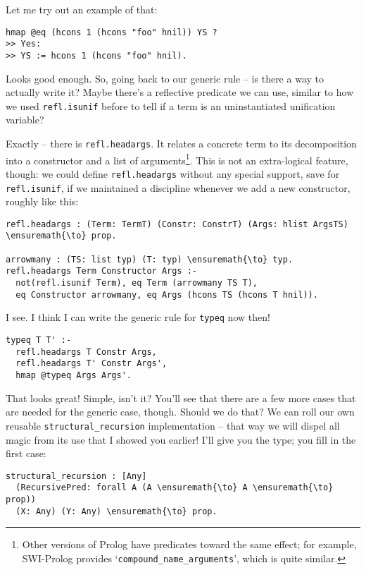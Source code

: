 \heroSTUDENT{} Let me try out an example of that:

\begin{verbatim}
hmap @eq (hcons 1 (hcons "foo" hnil)) YS ?
>> Yes:
>> YS := hcons 1 (hcons "foo" hnil).
\end{verbatim}

Looks good enough. So, going back to our generic rule -- is there a way
to actually write it? Maybe there's a reflective predicate we can use,
similar to how we used \texttt{refl.isunif} before to tell if a term is
an uninstantiated unification variable?

\heroADVISOR{} Exactly -- there is \texttt{refl.headargs}. It relates a
concrete term to its decomposition into a constructor and a list of
arguments\footnote{Other versions of Prolog have predicates toward the same effect; for example, SWI-Prolog \citep{wielemaker2012swi} provides `\texttt{compound\_{}name\_{}arguments}', which is quite similar.}.
This is not an extra-logical feature, though: we could define
\texttt{refl.headargs} without any special support, save for
\texttt{refl.isunif}, if we maintained a discipline whenever we add a
new constructor, roughly like this:

\begin{verbatim}
refl.headargs : (Term: TermT) (Constr: ConstrT) (Args: hlist ArgsTS) \ensuremath{\to} prop.

arrowmany : (TS: list typ) (T: typ) \ensuremath{\to} typ.
refl.headargs Term Constructor Args :-
  not(refl.isunif Term), eq Term (arrowmany TS T),
  eq Constructor arrowmany, eq Args (hcons TS (hcons T hnil)).
\end{verbatim}

\heroSTUDENT{} I see. I think I can write the generic rule for \texttt{typeq}
now then!

\begin{verbatim}
typeq T T' :-
  refl.headargs T Constr Args,
  refl.headargs T' Constr Args',
  hmap @typeq Args Args'.
\end{verbatim}

\heroADVISOR{} That looks great! Simple, isn't it? You'll see that there are a
few more cases that are needed for the generic case, though. Should we
do that? We can roll our own reusable \texttt{structural\_recursion}
implementation -- that way we will dispel all magic from its use that I
showed you earlier! I'll give you the type; you fill in the first case:

\begin{verbatim}
structural_recursion : [Any] 
  (RecursivePred: forall A (A \ensuremath{\to} A \ensuremath{\to} prop))
  (X: Any) (Y: Any) \ensuremath{\to} prop.
\end{verbatim}

